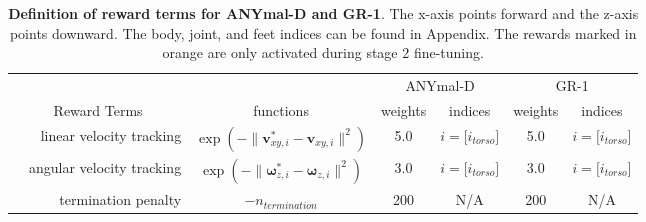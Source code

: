 \documentclass[9pt,twocolumn,twoside]{osajnl}
\begin{document}
\begin{table}[h]
\centering
\caption{\textbf{Definition of reward terms for ANYmal-D and GR-1}. The x-axis points forward and the z-axis points downward. The body, joint, and feet indices can be found in Appendix. The rewards marked in orange are only activated during stage 2 fine-tuning.}
\label{tab:rew_func}
\begin{tabular}{|crc|cc|cc|}
\hline
\multicolumn{2}{|c|}{}                                                                        &                                                                   & \multicolumn{2}{c|}{ANYmal-D}                                                             & \multicolumn{2}{c|}{GR-1}                                                                                                                                       \\ \cline{4-7} 
\multicolumn{2}{|c|}{\multirow{-2}{*}{Reward Terms}}                                          & \multirow{-2}{*}{functions}                                       & \multicolumn{1}{c|}{weights}                     & indices                                & \multicolumn{1}{c|}{weights}                     & indices                                                                                                      \\ \hline
\multicolumn{1}{|c|}{}                              & linear velocity tracking                & $\exp(-\lVert \mathbf{v}_{xy, i}^{*} - \mathbf{v}_{xy, i}\rVert^2)$                 & \multicolumn{1}{c|}{5.0}                         & $i = {[}i_{torso}{]}$               & \multicolumn{1}{c|}{5.0}                         & $i = {[}i_{torso}{]}$                                                                                       \\ \cline{4-7} 
\multicolumn{1}{|c|}{}                              & angular velocity tracking               & $\exp(-\lVert \boldsymbol{\omega}_{z, i}^{*} - \boldsymbol{\omega}_{z, i} \rVert^2)$ & \multicolumn{1}{c|}{3.0}                         & $i = {[}i_{torso}{]}$                 & \multicolumn{1}{c|}{3.0}                         & $i = {[}i_{torso}{]}$                                                                                       \\ \cline{4-7} 
\multicolumn{1}{|c|}{}                              & termination penalty                     & $-n_{termination}$                                                & \multicolumn{1}{c|}{200}                         & N/A                                    & \multicolumn{1}{c|}{200}                         & N/A                                                                                                          \\ \cline{4-7} 

\end{tabular}
\end{table}
\end{document}
